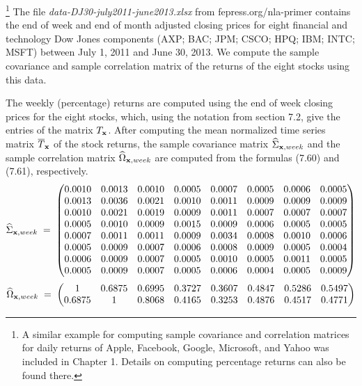
\begin{examplex}
\footnote{A similar example for computing sample covariance and correlation
matrices for daily returns of Apple, Facebook, Google, Microsoft, and Yahoo was
included in Chapter 1. Details on computing percentage returns can also be found
there.}
The file \textit{data-DJ30-july2011-june2013.xlsx} from fepress.org/nla-primer
contains the end of week and end of month adjusted closing prices for eight
financial and technology Dow Jones components (AXP; BAC; JPM; CSCO; HPQ; IBM;
INTC; MSFT) between July 1, 2011 and June 30, 2013. We compute the sample
covariance and sample correlation matrix of the returns of the eight stocks using
this data.

The weekly (percentage) returns are computed using the end of week closing prices
for the eight stocks, which, using the notation from section 7.2, give the entries
of the matrix $T_{\mathbf{x}}$. After computing the mean normalized time series matrix
$\overline{T}_{\mathbf{x}}$ of the stock returns, the sample covariance matrix
$\widehat{\Sigma}_{\mathbf{x},week}$ and the sample correlation matrix
$\widehat{\Omega}_{\mathbf{x},week}$ are computed from the formulas (7.60) and (7.61),
respectively.
\[
\widehat{\Sigma}_{\mathbf{x},week} \;=\;
\begin{pmatrix}
0.0010 & 0.0013 & 0.0010 & 0.0005 & 0.0007 & 0.0005 & 0.0006 & 0.0005 \\
0.0013 & 0.0036 & 0.0021 & 0.0010 & 0.0011 & 0.0009 & 0.0009 & 0.0009 \\
0.0010 & 0.0021 & 0.0019 & 0.0009 & 0.0011 & 0.0007 & 0.0007 & 0.0007 \\
0.0005 & 0.0010 & 0.0009 & 0.0015 & 0.0009 & 0.0006 & 0.0005 & 0.0005 \\
0.0007 & 0.0011 & 0.0011 & 0.0009 & 0.0034 & 0.0008 & 0.0010 & 0.0006 \\
0.0005 & 0.0009 & 0.0007 & 0.0006 & 0.0008 & 0.0009 & 0.0005 & 0.0004 \\
0.0006 & 0.0009 & 0.0007 & 0.0005 & 0.0010 & 0.0005 & 0.0011 & 0.0005 \\
0.0005 & 0.0009 & 0.0007 & 0.0005 & 0.0006 & 0.0004 & 0.0005 & 0.0009
\end{pmatrix}
\]
\[
\widehat{\Omega}_{\mathbf{x},week} \;=\;
\begin{pmatrix}
1      & 0.6875 & 0.6995 & 0.3727 & 0.3607 & 0.4847 & 0.5286 & 0.5497 \\
0.6875 & 1      & 0.8068 & 0.4165 & 0.3253 & 0.4876 & 0.4517 & 0.4771 \\

\end{pmatrix}\]
\end{examplex}
